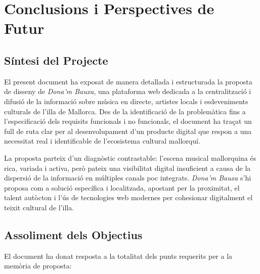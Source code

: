 \chapter{Conclusions i Perspectives de Futur}
\label{chapter:conclusion}

\section{Síntesi del Projecte}

El present document ha exposat de manera detallada i estructurada la proposta de disseny de \textit{Dona'm Bauxa}, una plataforma web dedicada a la centralització i difusió de la informació sobre música en directe, artistes locals i esdeveniments culturals de l'illa de Mallorca. Des de la identificació de la problemàtica fins a l'especificació dels requisits funcionals i no funcionals, el document ha traçat un full de ruta clar per al desenvolupament d'un producte digital que respon a una necessitat real i identificable de l'ecosistema cultural mallorquí.

La proposta parteix d'un diagnòstic contrastable: l'escena musical mallorquina és rica, variada i activa, però pateix una visibilitat digital insuficient a causa de la dispersió de la informació en múltiples canals poc integrats. \textit{Dona'm Bauxa} s'hi proposa com a solució específica i localitzada, apostant per la proximitat, el talent autòcton i l'ús de tecnologies web modernes per cohesionar digitalment el teixit cultural de l'illa.

\section{Assoliment dels Objectius}

El document ha donat resposta a la totalitat dels punts requerits per a la memòria de proposta:

